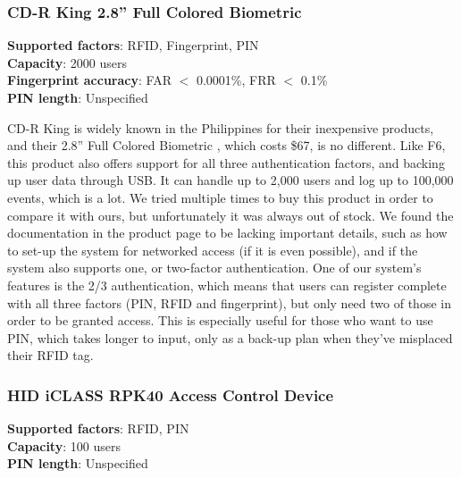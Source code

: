 \subsubsection{CD-R King 2.8'' Full Colored Biometric}
\begin{spacing}{1.35}
\textbf{Supported factors}: RFID, Fingerprint, PIN \\
\textbf{Capacity}: 2000 users \\
\textbf{Fingerprint accuracy}: FAR $<$ 0.0001\%, FRR $<$ 0.1\% \\
\textbf{PIN length}: Unspecified \\
\end{spacing}

\noindent CD-R King is widely known in the Philippines for their inexpensive products, and their 2.8'' Full Colored Biometric \cite{CDRKing_Biometric}, which costs \$67, is no different. Like F6, this product also offers support for all three authentication factors, and backing up user data through USB. It can handle up to 2,000 users and log up to 100,000 events, which is a lot. We tried multiple times to buy this product in order to compare it with ours, but unfortunately it was always out of stock. We found the documentation in the product page to be lacking important details, such as how to set-up the system for networked access (if it is even possible), and if the system also supports one, or two-factor authentication. One of our system's features is the 2/3 authentication, which means that users can register complete with all three factors (PIN, RFID and fingerprint), but only need two of those in order to be granted access. This is especially useful for those who want to use PIN, which takes longer to input, only as a back-up plan when they've misplaced their RFID tag.

\pagebreak

\subsubsection{HID iCLASS RPK40 Access Control Device}
\begin{spacing}{1.35}
\textbf{Supported factors}: RFID, PIN \\
\textbf{Capacity}: 100 users \\
\textbf{PIN length}: Unspecified \\
\end{spacing}

